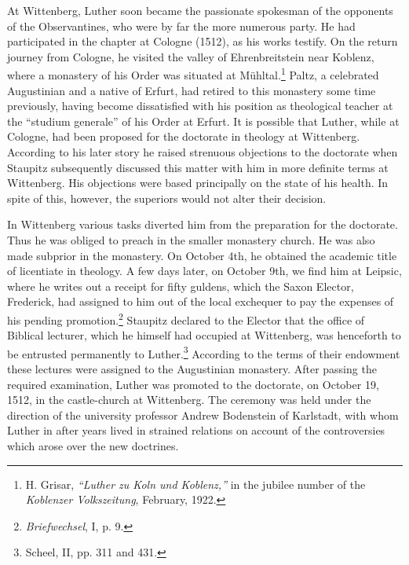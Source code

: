 At Wittenberg, Luther soon became the passionate spokesman of
the opponents of the Observantines, who were by far the more
numerous party. He had participated in the chapter at Cologne
(1512), as his works testify. On the return journey from Cologne,
he visited the valley of Ehrenbreitstein near Koblenz, where a monastery
of his Order was situated at Mühltal.\footnote{
    H. Grisar, \textit{``Luther zu Koln und Koblenz,''} in the
    jubilee number of the \textit{Koblenzer Volkszeitung}, February, 1922.}
Paltz, a celebrated
Augustinian and a native of Erfurt, had retired to this monastery
some time previously, having become dissatisfied with his position
as theological teacher at the “studium generale” of his Order at Erfurt.
It is possible that Luther, while at Cologne, had been proposed
for the doctorate in theology at Wittenberg. According to his later
story he raised strenuous objections to the doctorate when Staupitz
subsequently discussed this matter with him in more definite terms
at Wittenberg. His objections were based principally on the state
of his health. In spite of this, however, the superiors would not alter
their decision.

In Wittenberg various tasks diverted him from the preparation for
the doctorate. Thus he was obliged to preach in the smaller monastery
church. He was also made subprior in the monastery. On
October 4th, he obtained the academic title of licentiate in theology.
A few days later, on October 9th, we find him at Leipsic, where
he writes out a receipt for fifty guldens, which the Saxon Elector,
Frederick, had assigned to him out of the local exchequer to pay
the expenses of his pending promotion.\footnote{\textit{Briefwechsel}, I, p. 9.}
Staupitz declared to the
Elector that the office of Biblical lecturer, which he himself had occupied
at Wittenberg, was henceforth to be entrusted permanently
to Luther.\footnote{Scheel, II, pp. 311 and 431.}
According to the terms of their endowment these lectures
were assigned to the Augustinian monastery. After passing the
required examination, Luther was promoted to the doctorate, on
October 19, 1512, in the castle-church at Wittenberg. The ceremony
was held under the direction of the university professor Andrew
Bodenstein of Karlstadt, with whom Luther in after years lived in
strained relations on account of the controversies which arose over
the new doctrines.
